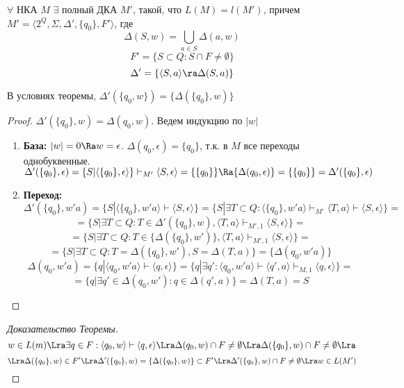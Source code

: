 \begin{theorem}
    \(\forall\) НКА \(M\) \(\exists\) полный ДКА \(M'\), такой, что \(L(M) = l(M')\), причем \(M' = \langle 2^Q, \Sigma, \Delta', \{q_0\}, F'\rangle\), где
    \[\Delta(S, w) = \bigcup_{a \in S} \Delta(a, w)\]
    \[F' = \{S \subset Q: S \cap F \ne \emptyset\}\]
    \[\Delta' = \{\langle S, a\rangle  \ra \Delta(S, a)\}\]
\end{theorem}
\begin{lemma}
    В условиях теоремы, \(\Delta'(\{q_0, w\}) = \{\Delta(\{q_0\}, w)\}\)
\end{lemma}
\begin{proof}
    \(\Delta'(\{q_0\}, w) = \Delta(q_0, w)\). Ведем индукцию по \(|w|\)
    \begin{enumerate}
        \item[] \textbf{База:} \(|w| = 0 \Ra w = \epsilon\). \(\Delta(q_0, \epsilon) = \{q_0\}\), т.к. в \(M\) все переходы однобуквенные. \(\Delta'(\{q_0\}, \epsilon) = \{S | \langle \{q_0\}, \epsilon \rangle\} \vdash_{M'}\langle S, \epsilon \rangle = \{\{q_0\}\} \Ra \{\Delta(q_0, \epsilon)\} = \{\{q_0\}\} = \Delta'(\{q_0\}, \epsilon)\)
        
        \item[] \textbf{Переход:}
        \[\Delta'(\{q_0\}, w'a) = \{S | \langle \{q_0\}, w'a \rangle \vdash \langle S, \epsilon \rangle\} = \{S| \exists T \subset Q: \langle \{q_0\}, w'a \rangle \vdash_{M'} \langle T, a \rangle \vdash \langle S, \epsilon \rangle\} =\]
        \[ = \{S | \exists T \subset Q: T \in \Delta'(\{q_0\}, w), \langle T, a \rangle \vdash_{M', 1} \langle S, \epsilon \rangle\} = \]
        \[ = \{S | \exists T \subset Q: T \in \{\Delta(\{q_0\}, w')\}, \langle T, a \rangle \vdash_{M', 1} \langle S, \epsilon \rangle\} = \]
        \[ = \{S | \exists T \subset Q: T = \Delta(\{q_0\}, w'), S = \Delta(T, a)\} = \{\Delta(q_0, w'a)\}\]
        \[\Delta(q_0, w'a) = \{q | \langle q_0, w'a \rangle \vdash \langle q, \epsilon \rangle\} = \{q | \exists q': \langle q_0, w'a \rangle \vdash \langle q', a \rangle \vdash_{M, 1} \langle q, \epsilon \rangle\} = \]
        \[= \{q | \exists q' \in \Delta(q_0, w') : q \in \Delta(q', a)\} = \Delta(T, a) = S\]

    \end{enumerate}
\end{proof}
\begin{proof}[Доказательство Теоремы]
    \[w \in L(m) \Lra \exists q \in F: \langle q_0, w \rangle \vdash \langle q, \epsilon \rangle \Lra \Delta(q_0, w) \cap F \ne \emptyset \Lra \Delta(\{q_0\}, w) \cap F \ne \emptyset \Lra\]
    \[\Lra \Delta(\{q_0\}, w) \in F' \Lra \Delta'(\{q_0\}, w) = \{\Delta(\{q_0\}, w)\} \subset F' \Lra \Delta'(\{q_0\}, w) \cap F \ne \emptyset \Lra w \in L(M')\]
\end{proof}

